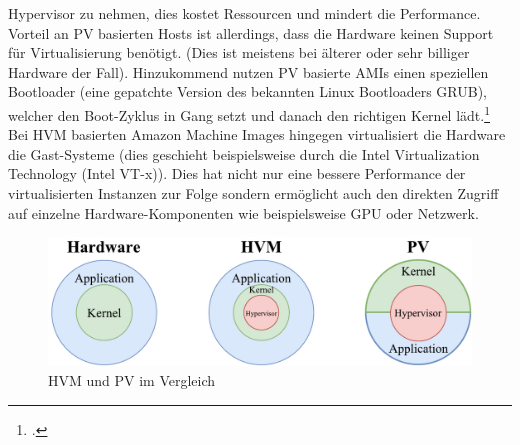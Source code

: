 \documentclass[titlepage]{report}
\begin{document}
Hypervisor zu nehmen, dies kostet Ressourcen und mindert die
Performance. Vorteil an PV basierten Hosts ist allerdings, dass die
Hardware keinen Support für Virtualisierung benötigt. (Dies ist meistens
bei älterer oder sehr billiger Hardware der Fall). Hinzukommend nutzen
PV basierte AMIs einen speziellen Bootloader (eine gepatchte Version des
bekannten Linux Bootloaders GRUB), welcher den Boot\hyp{}Zyklus in
Gang setzt und danach den richtigen Kernel
lädt.\footcite{virtualization} Bei HVM basierten Amazon Machine Images
hingegen virtualisiert die Hardware die Gast\hyp{}Systeme (dies geschieht
beispielsweise durch die Intel Virtualization Technology (Intel VT\hyp{}x)).
Dies hat nicht nur eine bessere Performance der virtualisierten
Instanzen zur Folge sondern ermöglicht auch den direkten Zugriff auf
einzelne Hardware\hyp{}Komponenten wie beispielsweise GPU oder Netzwerk.
\begin{figure}[h]
    \centering
    \includegraphics[width=1.0\textwidth]{figures/hvm_pv.pdf}
    \caption{HVM und PV im Vergleich}\label{fig:5}
\end{figure}
\end{document}

